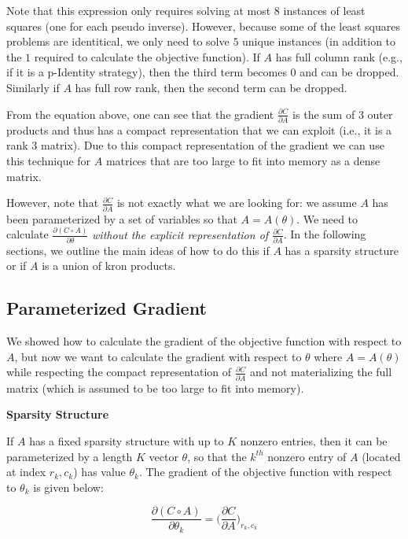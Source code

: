 \documentclass[12]{article}
\begin{document}
Note that this expression only requires solving at most $8$ instances of least squares (one for each pseudo inverse).  However, because some of the least squares problems are identitical, we only need to solve $5$ unique instances (in addition to the $1$ required to calculate the objective function).  If $A$ has full column rank (e.g., if it is a p-Identity strategy), then the third term becomes $0$ and can be dropped.  Similarly if $A$ has full row rank, then the second term can be dropped.

From the equation above, one can see that the gradient $ \frac{\partial C}{\partial A} $ is the sum of $3$ outer products and thus has a compact representation that we can exploit (i.e., it is a rank $3$ matrix).  Due to this compact representation of the gradient we can use this technique for $A$ matrices that are too large to fit into memory as a dense matrix.

However, note that $ \frac{\partial C}{\partial A}$ is not exactly what we are looking for: we assume $A$ has been parameterized by a set of variables so that $ A = A(\theta) $.  We need to calculate $ \frac{\partial (C \circ A)}{\partial \theta} $ \emph{without the explicit representation of $ \frac{\partial C}{\partial A} $}.   In the following sections, we outline the main ideas of how to do this if $A$ has a sparsity structure or if $A$ is a union of kron products.  

\subsection{Parameterized Gradient}

We showed how to calculate the gradient of the objective function with respect to $A$, but now we want to calculate the gradient with respect to $\theta$ where $ A = A(\theta) $ while respecting the compact representation of $\frac{\partial C}{\partial A}$ and not materializing the full matrix (which is assumed to be too large to fit into memory). 

\textbf{Sparsity Structure}

If $A$ has a fixed sparsity structure with up to $K$ nonzero entries, then it can be parameterized by a length $K$ vector $\theta$, so that the $k^{th}$ nonzero entry of $A$ (located at index $r_k, c_k$) has value $\theta_k$.  The gradient of the objective function with respect to $\theta_k$ is given below:

$$ \frac{\partial (C \circ A)}{\partial \theta_k} = \Big(\frac{\partial C}{\partial A}\Big)_{r_k, c_k} $$
\end{document}

